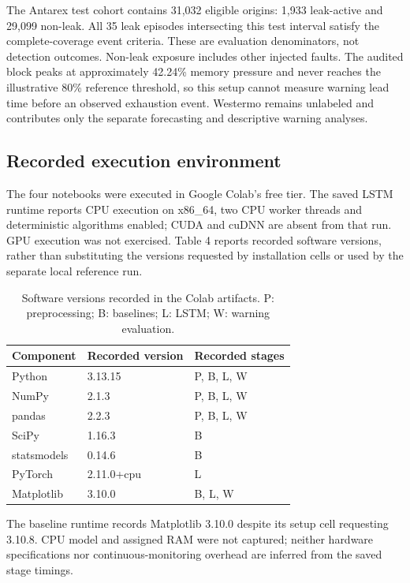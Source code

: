 \documentclass[10pt,a4paper,twocolumn]{article}
\begin{document}
The Antarex test cohort contains 31,032 eligible origins: 1,933 leak-active and 29,099 non-leak. All 35 leak episodes intersecting this test interval satisfy the complete-coverage event criteria. These are evaluation denominators, not detection outcomes. Non-leak exposure includes other injected faults. The audited block peaks at approximately 42.24\% memory pressure and never reaches the illustrative 80\% reference threshold, so this setup cannot measure warning lead time before an observed exhaustion event. Westermo remains unlabeled and contributes only the separate forecasting and descriptive warning analyses.

\subsection{Recorded execution environment}

The four notebooks were executed in Google Colab's free tier. The saved LSTM runtime reports CPU execution on x86\_64, two CPU worker threads and deterministic algorithms enabled; CUDA and cuDNN are absent from that run. GPU execution was not exercised. Table 4 reports recorded software versions, rather than substituting the versions requested by installation cells or used by the separate local reference run.

\begin{table}[tbp]
\centering
\caption{Software versions recorded in the Colab artifacts. P: preprocessing; B: baselines; L: LSTM; W: warning evaluation.}
\label{tab:4}
\fontsize{8.5}{10.2}\selectfont
\setlength{\tabcolsep}{2.4pt}
\renewcommand{\arraystretch}{1.17}
\begin{tabularx}{\linewidth}{@{}L{0.9}L{0.94}L{1.16}@{}}
\toprule
\textbf{Component} & \textbf{Recorded version} & \textbf{Recorded stages} \\
\midrule
Python & 3.13.15 & P, B, L, W \\
NumPy & 2.1.3 & P, B, L, W \\
pandas & 2.2.3 & P, B, L, W \\
SciPy & 1.16.3 & B \\
statsmodels & 0.14.6 & B \\
PyTorch & 2.11.0+cpu & L \\
Matplotlib & 3.10.0 & B, L, W \\
\bottomrule
\end{tabularx}
\end{table}

The baseline runtime records Matplotlib 3.10.0 despite its setup cell requesting 3.10.8. CPU model and assigned RAM were not captured; neither hardware specifications nor continuous-monitoring overhead are inferred from the saved stage timings.
\end{document}
